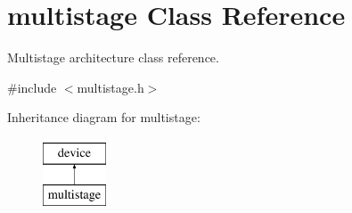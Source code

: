 \hypertarget{classmultistage}{
\section{multistage Class Reference}
\label{classmultistage}
}


Multistage architecture class reference.  




{\ttfamily \#include $<$multistage.h$>$}

Inheritance diagram for multistage:\begin{figure}[H]
\begin{center}
\leavevmode
\includegraphics[height=2cm]{classmultistage}
\end{center}
\end{figure}
